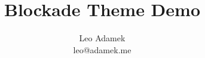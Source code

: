 \documentclass[a4paper]{report}
\title{Blockade Theme Demo}
\author{
  Leo Adamek \\
  leo@adamek.me
}
\begin{document}
\maketitle

\lipsum
\end{document}
